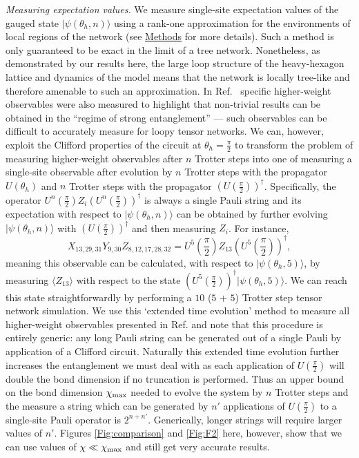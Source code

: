 \documentclass[%
 superscriptaddress,
 amsmath,amssymb,
 prx, nofootinbib,
 twocolumn
]{revtex4-2}
\begin{document}
\emph{Measuring expectation values.} We measure single-site expectation values of the gauged state $\vert \psi(\theta_{h}, n) \rangle$ using a rank-one approximation for the environments of local regions of the network (see \hyperref[Sec:Methods]{Methods} for more details). Such a method is only guaranteed to be exact in the limit of a tree network. Nonetheless, as demonstrated by our results here, the large loop structure of the 
heavy-hexagon lattice and dynamics of the model means that the network is locally tree-like and therefore amenable to such an approximation. In Ref.~\cite{kim2023} specific higher-weight observables were also measured to highlight that non-trivial results can be obtained in the ``regime of strong entanglement'' --- such observables can be difficult to accurately measure for loopy tensor networks. 
We can, however, exploit the Clifford properties of the circuit at $\theta_{h} = \frac{\pi}{2}$ to transform the problem of measuring higher-weight observables after $n$ Trotter steps into one of measuring a single-site observable after evolution by $n$ Trotter steps with the propagator $U(\theta_{h})$ and $n$ Trotter steps with the propagator $\left(U(\frac{\pi}{2})\right)^{\dagger}$. 
Specifically, the operator $U^{n}\left(\frac{\pi}{2}\right)Z_{i}\left(U^{n}\left(\frac{\pi}{2}\right)\right)^{\dagger}$ is always a single Pauli string and its expectation with respect to $\vert \psi(\theta_{h}, n) \rangle$ can be obtained by further evolving $\vert \psi(\theta_{h}, n) \rangle$ with $\left(U(\frac{\pi}{2})\right)^{\dagger}$ and then measuring $Z_{i}$. For instance,
\begin{equation}
    X_{13, 29, 31}Y_{9,30}Z_{8,12,17,28,32} =  U^{5}\left(\frac{\pi}{2}\right)Z_{13}\left(U^{5}\left(\frac{\pi}{2}\right)\right)^{\dagger},
\end{equation} 
meaning this observable can be calculated, with respect to $\vert \psi(\theta_h,5) \rangle$, by measuring $\langle Z_{13} \rangle$ with respect to the state $\left( U^{5}\left(\frac{\pi}{2}\right)\right)^{\dagger}\vert \psi(\theta_h,5) \rangle$. We can reach this state straightforwardly by performing a $10$ ($5$ + $5$) Trotter step tensor network simulation. We use this `extended time evolution' method to measure all higher-weight observables presented in Ref. \cite{kim2023} and note that this procedure is entirely generic: any long Pauli string can be generated out of a single Pauli by application of a Clifford circuit. Naturally this extended time evolution further increases the entanglement we must deal with as each application of $U\left(\frac{\pi}{2}\right)$ will double the bond dimension if no truncation is performed. Thus an upper bound on the bond dimension $\chi_{\rm max}$ needed to evolve the system by $n$ Trotter steps and the measure a string which can be generated by $n'$ applications of $U\left(\frac{\pi}{2}\right)$ to a single-site Pauli operator is $2^{n + n'}$. Generically, longer strings will require larger values of $n'$. Figures \ref{Fig:comparison} and \ref{Fig:F2} here, however, show that we can use values of $\chi \ll \chi_{\rm max}$ and still get very accurate results.
\end{document}
